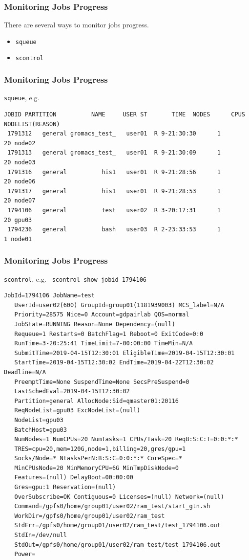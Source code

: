 \documentclass{beamer}
\newcommand{\code}[1]{\colorbox{codegray}{\texttt{#1}}}
\begin{document}
\begin{frame}
\frametitle{Monitoring Jobs Progress}
There are several ways to monitor jobs progress.  
\bigskip
\begin{itemize}
    \item \code{squeue}
    \pause
    \bigskip
    \item \code{scontrol}
\end{itemize}
\end{frame}


\begin{frame}[fragile]
\frametitle{Monitoring Jobs Progress}
\code{squeue}, e.g. 
\begingroup
\tiny
\begin{lstlisting}[backgroundcolor = \color{codegray},showstringspaces=false]
   JOBID PARTITION          NAME     USER ST       TIME  NODES      CPUS NODELIST(REASON)
 1791312   general gromacs_test_   user01  R 9-21:30:30      1        20 node02
 1791313   general gromacs_test_   user01  R 9-21:30:09      1        20 node03
 1791316   general          his1   user01  R 9-21:28:56      1        20 node06
 1791317   general          his1   user01  R 9-21:28:53      1        20 node07
 1794106   general          test   user02  R 3-20:17:31      1        20 gpu03
 1794236   general          bash   user03  R 2-23:33:53      1         1 node01
\end{lstlisting}
\endgroup
\end{frame}



\begin{frame}[fragile]
\frametitle{Monitoring Jobs Progress}
\code{scontrol}, e.g. \code{ scontrol show jobid 1794106}
\begingroup
\tiny
\begin{lstlisting}[backgroundcolor = \color{codegray},showstringspaces=false]
JobId=1794106 JobName=test
   UserId=user02(600) GroupId=group01(1181939003) MCS_label=N/A
   Priority=28575 Nice=0 Account=gdpairlab QOS=normal
   JobState=RUNNING Reason=None Dependency=(null)
   Requeue=1 Restarts=0 BatchFlag=1 Reboot=0 ExitCode=0:0
   RunTime=3-20:25:41 TimeLimit=7-00:00:00 TimeMin=N/A
   SubmitTime=2019-04-15T12:30:01 EligibleTime=2019-04-15T12:30:01
   StartTime=2019-04-15T12:30:02 EndTime=2019-04-22T12:30:02 Deadline=N/A
   PreemptTime=None SuspendTime=None SecsPreSuspend=0
   LastSchedEval=2019-04-15T12:30:02
   Partition=general AllocNode:Sid=qmaster01:20116
   ReqNodeList=gpu03 ExcNodeList=(null)
   NodeList=gpu03
   BatchHost=gpu03
   NumNodes=1 NumCPUs=20 NumTasks=1 CPUs/Task=20 ReqB:S:C:T=0:0:*:*
   TRES=cpu=20,mem=120G,node=1,billing=20,gres/gpu=1
   Socks/Node=* NtasksPerN:B:S:C=0:0:*:* CoreSpec=*
   MinCPUsNode=20 MinMemoryCPU=6G MinTmpDiskNode=0
   Features=(null) DelayBoot=00:00:00
   Gres=gpu:1 Reservation=(null)
   OverSubscribe=OK Contiguous=0 Licenses=(null) Network=(null)
   Command=/gpfs0/home/group01/user02/ram_test/start_gtn.sh
   WorkDir=/gpfs0/home/group01/user02/ram_test
   StdErr=/gpfs0/home/group01/user02/ram_test/test_1794106.out
   StdIn=/dev/null
   StdOut=/gpfs0/home/group01/user02/ram_test/test_1794106.out
   Power=
\end{lstlisting}
\endgroup
\end{frame}
\end{document}
